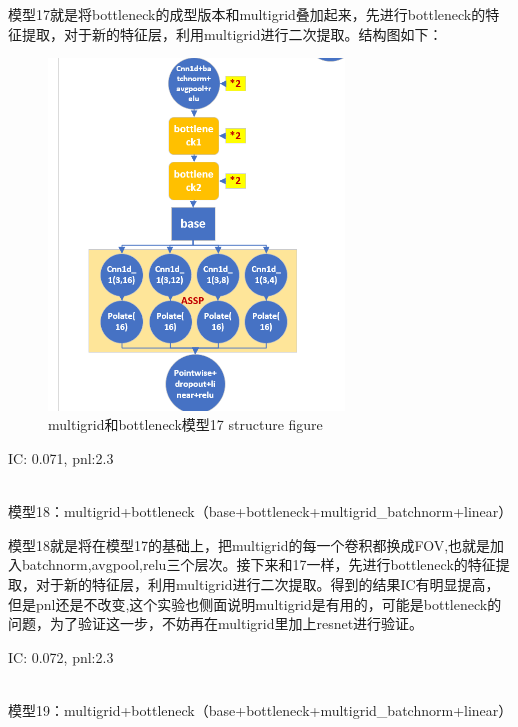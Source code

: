 \documentclass[11pt]{ctexart}
\begin{document}
模型17就是将bottleneck的成型版本和multigrid叠加起来，先进行bottleneck的特征提取，对于新的特征层，利用multigrid进行二次提取。结构图如下：
\begin{figure}[H]
\begin{center}
\includegraphics[width=0.7\textwidth]{str11.PNG}
\end{center}
\caption{multigrid和bottleneck模型17 structure figure}
\label{FIG.12}
\end{figure}

{\kaishu \small IC: 0.071, pnl:2.3}

~\\
模型18：multigrid+bottleneck（base+bottleneck+multigrid\_batchnorm+linear）

模型18就是将在模型17的基础上，把multigrid的每一个卷积都换成FOV,也就是加入batchnorm,avgpool,relu三个层次。接下来和17一样，先进行bottleneck的特征提取，对于新的特征层，利用multigrid进行二次提取。得到的结果IC有明显提高，但是pnl还是不改变,这个实验也侧面说明multigrid是有用的，可能是bottleneck的问题，为了验证这一步，不妨再在multigrid里加上resnet进行验证。

{\kaishu \small IC: 0.072, pnl:2.3}

~\\
模型19：multigrid+bottleneck（base+bottleneck+multigrid\_batchnorm+linear）
\end{document}

